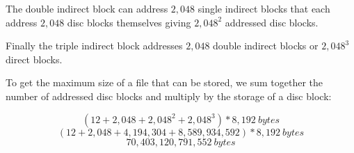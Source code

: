 \documentclass[11pt, letterpaper]{hw}
\begin{document}
\begin{enumerate}
The double indirect block can address $2,048$ single indirect blocks that each address $2,048$ disc blocks themselves giving $2,048^2$ addressed disc blocks. 

Finally the triple indirect block addresses $2,048$ double indirect blocks or $2,048^3$ direct blocks.

To get the maximum size of a file that can be stored, we sum together the number of addressed disc blocks and multiply by the storage of a disc block:

$$(12 + 2,048 + 2,048^2 + 2,048^3) * 8,192 \ bytes$$
$$(12 + 2,048 + 4,194,304 + 8,589,934,592) * 8,192 \ bytes$$
$$\boxed{70,403,120,791,552 \ bytes}$$
\end{enumerate}
\end{document}
